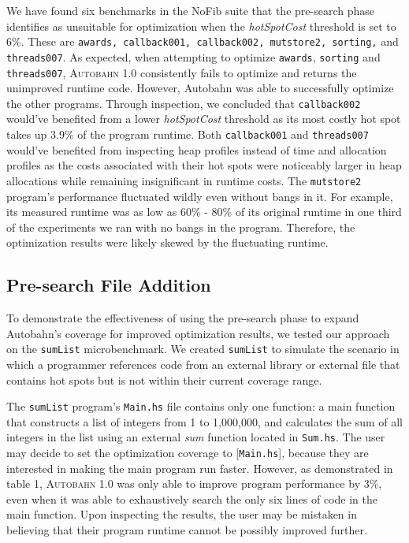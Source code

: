 \documentclass[format=sigplan, review=true]{acmart}
\newcommand{\hotspots}[0]{hot spots}
\newcommand{\hotspotcost}[0]{\textit{hotSpotCost}}
\newcommand{\Ao}[0]{\textsc{Autobahn 1.0}}
\newcommand{\preopt}[0]{pre-search}
\newcommand{\Preopt}[0]{Pre-search}
\newcommand{\unimp}[0]{unimproved}
\begin{document}
We have found six benchmarks in the NoFib suite that the \preopt{} phase identifies as unsuitable for optimization when the \hotspotcost{} threshold is set to 6\%. These are \texttt{awards, callback001, callback002, mutstore2, sorting,} and \texttt{threads007}. As expected, when attempting to optimize \texttt{awards}, \texttt{sorting} and \texttt{threads007}, \Ao{} consistently fails to optimize and returns the \unimp{} runtime code. However, Autobahn was able to successfully optimize the other programs. Through inspection, we concluded that \texttt{callback002} would've benefited from a lower \hotspotcost{} threshold as its most costly hot spot takes up 3.9\% of the program runtime. Both \texttt{callback001} and \texttt{threads007} would've benefited from inspecting heap profiles instead of time and allocation profiles as the costs associated with their hot spots were noticeably larger in heap allocations while remaining insignificant in runtime costs. The \texttt{mutstore2} program's performance fluctuated wildly even without bangs in it. For example, its measured runtime was as low as 60\% - 80\% of its original runtime in one third of the experiments we ran with no bangs in the program. Therefore, the optimization results were likely skewed by the fluctuating runtime.

\subsection{\Preopt{} File Addition}

To demonstrate the effectiveness of using the \preopt{} phase to expand Autobahn's coverage for improved optimization results, we tested our approach on the \texttt{sumList} microbenchmark. We created \texttt{sumList} to simulate the scenario in which a programmer references code from an external library or external file that contains \hotspots{} but is not within their current coverage range. 


The \texttt{sumList} program's \texttt{Main.hs} file contains only one function: a main function that constructs a list of integers from 1 to 1,000,000, and calculates the sum of all integers in the list using an external \textit{sum} function located in \texttt{Sum.hs}. The user may decide to set the optimization coverage to [\texttt{Main.hs}], because they are interested in making the main program run faster. However, as demonstrated in table 1, \Ao{} was only able to improve program performance by 3\%, even when it was able to exhaustively search the only six lines of code in the main function. Upon inspecting the results, the user may be mistaken in believing that their program runtime cannot be possibly improved further. 
\end{document}

